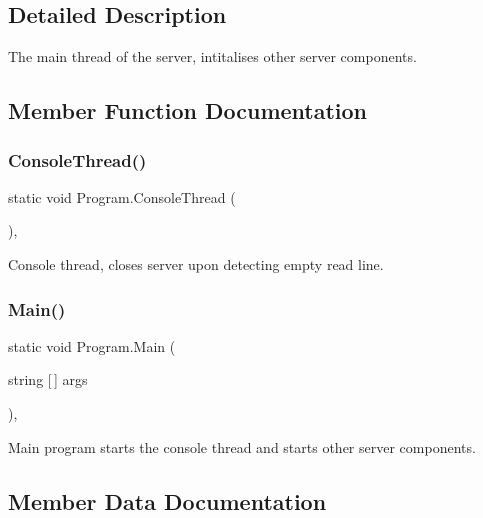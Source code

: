 \subsection{Detailed Description}
The main thread of the server, intitalises other server components. 



\subsection{Member Function Documentation}
\mbox{\label{class_program_a26b88087186eee007cda56afadba413b}} 
\subsubsection{\texorpdfstring{ConsoleThread()}{ConsoleThread()}}
{\footnotesize\ttfamily static void Program.\+Console\+Thread (\begin{DoxyParamCaption}{ }\end{DoxyParamCaption})\hspace{0.3cm}{\ttfamily [static]}, {\ttfamily [private]}}



Console thread, closes server upon detecting empty read line. 

\mbox{\label{class_program_ada72f8d1518f89bc2e6ad807d5059564}} 
\subsubsection{\texorpdfstring{Main()}{Main()}}
{\footnotesize\ttfamily static void Program.\+Main (\begin{DoxyParamCaption}\item[{string \mbox{[}$\,$\mbox{]}}]{args }\end{DoxyParamCaption})\hspace{0.3cm}{\ttfamily [static]}, {\ttfamily [private]}}



Main program starts the console thread and starts other server components. 



\subsection{Member Data Documentation}
\mbox{\label{class_program_a35293fe7c6f7bb00df67b738216dbb88}} 
